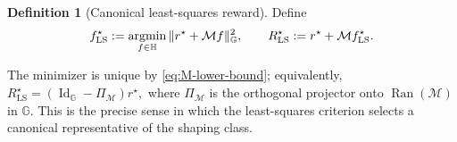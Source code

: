 \documentclass{article}
\theoremstyle{definition}
\newtheorem{definition}[proposition]{Definition}
\theoremstyle{remark}
\theoremstyle{plain}
\def\argmin{\operatornamewithlimits{argmin}}
\numberwithin{equation}{section}
\begin{document}
\begin{definition}[Canonical least-squares reward]
\label{def:canonical-LS-reward}
Define
\begin{equation}
\label{eq:population-LS-reward}
    f_{\mathrm{LS}}^\star
    :=
    \argmin_{f\in\mathbb H}
    \|r^\star+\mathcal M f\|_{\mathbb G}^2,
    \qquad
    R_{\mathrm{LS}}^\star
    :=
    r^\star+\mathcal M f_{\mathrm{LS}}^\star.
\end{equation}
\end{definition}
The minimizer is unique by \eqref{eq:M-lower-bound}; equivalently, \(R_{\mathrm{LS}}^\star
    =
    (\operatorname{Id}_{\mathbb G}-\Pi_{\mathcal M})r^\star,\)
where $\Pi_{\mathcal M}$ is the orthogonal projector onto $\operatorname{Ran}(\mathcal M)$ in $\mathbb G$. This is the precise sense in which the least-squares criterion selects a canonical representative of the shaping class.
\end{document}
